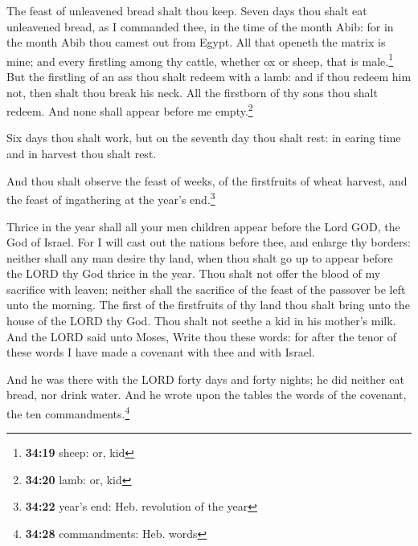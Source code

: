  The feast of unleavened bread shalt thou keep. Seven
days thou shalt eat unleavened bread, as I commanded thee, in the time
of the month Abib: for in the month Abib thou camest out from Egypt.
 All that openeth the matrix is mine; and every firstling
among thy cattle, whether ox or sheep, that is male.\footnote{\textbf{34:19}
  sheep: or, kid}  But the firstling of an ass thou shalt
redeem with a lamb: and if thou redeem him not, then shalt thou break
his neck. All the firstborn of thy sons thou shalt redeem. And none
shall appear before me empty.\footnote{\textbf{34:20} lamb: or, kid}

 Six days thou shalt work, but on the seventh day thou
shalt rest: in earing time and in harvest thou shalt rest.

 And thou shalt observe the feast of weeks, of the
firstfruits of wheat harvest, and the feast of ingathering at the year's
end.\footnote{\textbf{34:22} year's end: Heb. revolution of the year}

 Thrice in the year shall all your men children appear
before the Lord GOD, the God of Israel.  For I will cast
out the nations before thee, and enlarge thy borders: neither shall any
man desire thy land, when thou shalt go up to appear before the LORD thy
God thrice in the year.  Thou shalt not offer the blood
of my sacrifice with leaven; neither shall the sacrifice of the feast of
the passover be left unto the morning.  The first of the
firstfruits of thy land thou shalt bring unto the house of the LORD thy
God. Thou shalt not seethe a kid in his mother's milk. 
And the LORD said unto Moses, Write thou these words: for after the
tenor of these words I have made a covenant with thee and with Israel.

 And he was there with the LORD forty days and forty
nights; he did neither eat bread, nor drink water. And he wrote upon the
tables the words of the covenant, the ten commandments.\footnote{\textbf{34:28}
  commandments: Heb. words}

